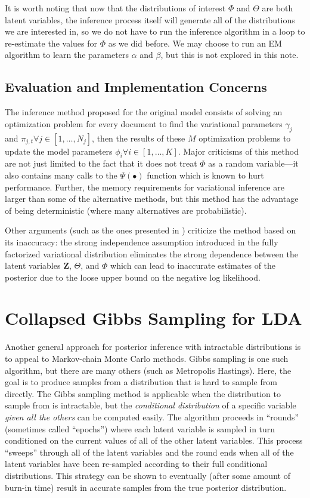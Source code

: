 \documentclass[11pt]{article}
\begin{document}
It is worth noting that now that the distributions of interest $\Phi$ and
$\Theta$ are both latent variables, the inference process itself will
generate all of the distributions we are interested in, so we do not have
to run the inference algorithm in a loop to re-estimate the values for
$\Phi$ as we did before. We may choose to run an EM algorithm to learn the
parameters $\alpha$ and $\beta$, but this is not explored in this note.

\subsection{Evaluation and Implementation Concerns}

The inference method proposed for the original model consists of solving an
optimization problem for every document to find the variational parameters
$\gamma_j$ and $\pi_{j,t} \forall j\in[1,\ldots,N_j]$, then the results of
these $M$ optimization problems to update the model parameters
$\phi_i\forall i\in[1,\ldots,K]$. Major criticisms of this method are not
just limited to the fact that it does not treat $\Phi$ as a random
variable---it also contains many calls to the $\Psi(\bullet)$ function
which is known to hurt performance. Further, the memory requirements for
variational inference are larger than some of the alternative methods, but
this method has the advantage of being deterministic (where many
alternatives are probabilistic).

Other arguments (such as the ones presented in \citet{Teh:2007:CVB})
criticize the method based on its inaccuracy: the strong independence
assumption introduced in the fully factorized variational distribution
eliminates the strong dependence between the latent variables $\mathbf{Z}$,
$\Theta$, and $\Phi$ which can lead to inaccurate estimates of the
posterior due to the loose upper bound on the negative log likelihood.

\section{Collapsed Gibbs Sampling for LDA}

Another general approach for posterior inference with intractable
distributions is to appeal to Markov-chain Monte Carlo methods. Gibbs
sampling is one such algorithm, but there are many others (such as
Metropolis Hastings). Here, the goal is to produce samples from a
distribution that is hard to sample from directly. The Gibbs sampling
method is applicable when the distribution to sample from is intractable,
but the \emph{conditional distribution} of a specific variable \emph{given
all the others} can be computed easily. The algorithm proceeds in
``rounds'' (sometimes called ``epochs'') where each latent variable is
sampled in turn conditioned on the current values of all of the other
latent variables. This process ``sweeps'' through all of the latent
variables and the round ends when all of the latent variables have been
re-sampled according to their full conditional distributions. This strategy
can be shown to eventually (after some amount of burn-in time) result in
accurate samples from the true posterior distribution.
\end{document}
